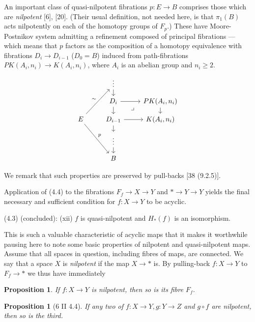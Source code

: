 \documentclass[openany,leqno]{book}  %
\newtheorem{prop}[theorem]{Proposition}
\begin{document}
An important class of quasi-nilpotent fibrations $p \colon   E \longrightarrow B$ comprises those which are {\em nilpotent} [6], [20]. (Their usual definition, not needed here, is that $\pi_1(B)$ acts nilpotently on each of the homotopy groups of $F_p$.) These have Moore-Postnikov system admitting a refinement composed of principal fibrations --- which means that $p$ factors as the composition of a homotopy equivalence with fibrations $D_i\longrightarrow D_{i-1}$ ($D_0 = B$) induced from path-fibrations $PK(A_i, n_i)\longrightarrow K(A_i,n_i)$, where $A_i$ is an abelian group and $n_i \geqslant 2$.
\[\begin{tikzcd}[row sep=small]
    & \vdots \arrow{d} &\\
    &  D_i \arrow{d} \arrow{r} \arrow[dr, phantom, "\lrcorner"]& PK(A_i,n_i) \arrow{d}\\
E\arrow{ruu}{\sim} \arrow{rdd}{p}   &  D_{i-1}  \arrow{d} \arrow{r}   & K(A_i,n_i) \\
    & \vdots \arrow{d} &\\
    & B &
\end{tikzcd}\]

We remark that such properties are preserved by pull-backs [38 (9.2.5)].

Application of (4.4) to the fibrations $F_f\longrightarrow X \longrightarrow Y$ and $* \longrightarrow Y \longrightarrow Y$ yields the final necessary and sufficient condition for $f\colon   X\longrightarrow Y$ to be acyclic.

(4.3) (concluded): (xii) $f$ is quasi-nilpotent and $H_*(f)$ is an isomorphism.

This is such a valuable characteristic of acyclic maps that it makes it worthwhile pausing here to note some basic properties of nilpotent and quasi-nilpotent maps. Assume that all spaces in question, including fibres of maps, are connected. We say that a space $X$ is {\em nilpotent} if the map $X \longrightarrow  *$ is. By pulling-back $f\colon   X \longrightarrow Y$ to $F_f \longrightarrow *$ we thus have immediately
\begin{prop}
	If $f\colon  X\longrightarrow Y$ is nilpotent, then so is its fibre $F_f$.
\end{prop}

\begin{prop}
[6 II 4.4] If any two of $f\colon  X\longrightarrow Y,g\colon   Y\longrightarrow Z$ and $g\circ f$ are nilpotent, then so is the third.
 \end{prop}   
\end{document}
